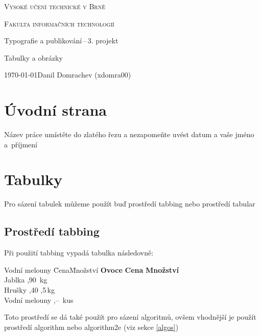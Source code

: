 \documentclass[a4paper,11pt,final]{article}
\begin{document}
	\begin{titlepage}
		\setcounter{page}{0}
		\begin{center}	
			\addtolength{\parskip}{0.6em}
			{\Huge
				\textsc{
					Vysoké učení technické v Brně}}
			
			{\huge 
				\textsc{
					Fakulta informačních technologií}}
			
			{\LARGE
				Typografie a publikování\,--\,3. projekt
				
				\Huge Tabulky a obrázky}
			
		\end{center}
		{\Large 
			\today \hfill Danil Domrachev (xdomra00)}
	\end{titlepage}
	
	\newpage
	\section{Úvodní strana}
	
	Název práce umístěte do zlatého řezu a nezapomeňte uvést  datum a vaše jméno a~příjmení
	
	\section{Tabulky}
	
	Pro sázení tabulek můžeme použít buď prostředí {\ttfamily tabbing} nebo prostředí {\ttfamily tabular}
	
	\subsection{Prostředí \ttfamily tabbing} 
	
	Při použití {\ttfamily tabbing} vypadá tabulka následovně:
	
	\begin{tabbing}
		Vodní melouny \quad \= Cena\quad \= Množství\kill
		\textbf{Ovoce} \> \textbf{Cena} \> \textbf{Množství}\\
		Jablka ,90 \,kg\\
		Hrušky ,40 ,5\,kg\\
		Vodní melouny ,-- \,kus
	\end{tabbing}
	
	{\raggedright
	Toto prostředí se dá také použít pro sázení algoritmů, ovšem vhodnější je použít prostředí {\ttfamily algorithm} nebo {\ttfamily algorithm2e} (viz sekce \ref{algos})}
	
\end{document}
